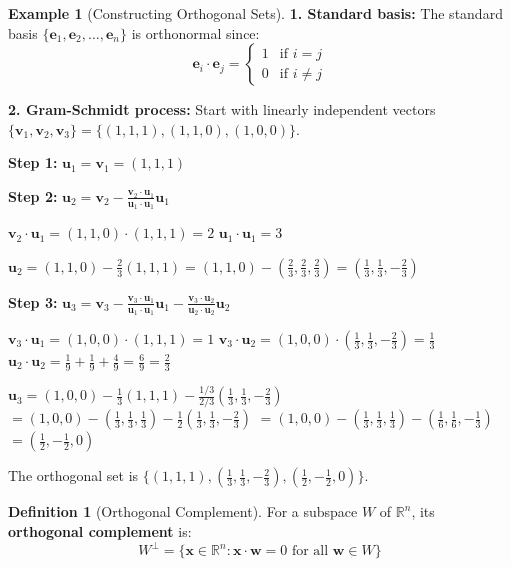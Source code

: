 \documentclass[12pt]{article}
\numberwithin{equation}{section}
\newcommand{\vect}[1]{\boldsymbol{#1}}   %
\theoremstyle{plain}
\theoremstyle{definition}
\newtheorem{definition}[theorem]{Definition}
\newtheorem{example}[theorem]{Example}
\theoremstyle{remark}
\begin{document}
\begin{example}[Constructing Orthogonal Sets]
\textbf{1. Standard basis:}
The standard basis $\{\vect{e}_1, \vect{e}_2, \ldots, \vect{e}_n\}$ is orthonormal since:
$$\vect{e}_i \cdot \vect{e}_j = \begin{cases} 1 & \text{if } i = j \\ 0 & \text{if } i \neq j \end{cases}$$

\textbf{2. Gram-Schmidt process:}
Start with linearly independent vectors $\{\vect{v}_1, \vect{v}_2, \vect{v}_3\} = \{(1,1,1), (1,1,0), (1,0,0)\}$.

\textbf{Step 1:} $\vect{u}_1 = \vect{v}_1 = (1,1,1)$

\textbf{Step 2:} $\vect{u}_2 = \vect{v}_2 - \frac{\vect{v}_2 \cdot \vect{u}_1}{\vect{u}_1 \cdot \vect{u}_1}\vect{u}_1$

$\vect{v}_2 \cdot \vect{u}_1 = (1,1,0) \cdot (1,1,1) = 2$
$\vect{u}_1 \cdot \vect{u}_1 = 3$

$\vect{u}_2 = (1,1,0) - \frac{2}{3}(1,1,1) = (1,1,0) - (\frac{2}{3}, \frac{2}{3}, \frac{2}{3}) = (\frac{1}{3}, \frac{1}{3}, -\frac{2}{3})$

\textbf{Step 3:} $\vect{u}_3 = \vect{v}_3 - \frac{\vect{v}_3 \cdot \vect{u}_1}{\vect{u}_1 \cdot \vect{u}_1}\vect{u}_1 - \frac{\vect{v}_3 \cdot \vect{u}_2}{\vect{u}_2 \cdot \vect{u}_2}\vect{u}_2$

$\vect{v}_3 \cdot \vect{u}_1 = (1,0,0) \cdot (1,1,1) = 1$
$\vect{v}_3 \cdot \vect{u}_2 = (1,0,0) \cdot (\frac{1}{3}, \frac{1}{3}, -\frac{2}{3}) = \frac{1}{3}$
$\vect{u}_2 \cdot \vect{u}_2 = \frac{1}{9} + \frac{1}{9} + \frac{4}{9} = \frac{6}{9} = \frac{2}{3}$

$\vect{u}_3 = (1,0,0) - \frac{1}{3}(1,1,1) - \frac{1/3}{2/3}(\frac{1}{3}, \frac{1}{3}, -\frac{2}{3})$
$= (1,0,0) - (\frac{1}{3}, \frac{1}{3}, \frac{1}{3}) - \frac{1}{2}(\frac{1}{3}, \frac{1}{3}, -\frac{2}{3})$
$= (1,0,0) - (\frac{1}{3}, \frac{1}{3}, \frac{1}{3}) - (\frac{1}{6}, \frac{1}{6}, -\frac{1}{3})$
$= (\frac{1}{2}, -\frac{1}{2}, 0)$

The orthogonal set is $\{(1,1,1), (\frac{1}{3}, \frac{1}{3}, -\frac{2}{3}), (\frac{1}{2}, -\frac{1}{2}, 0)\}$.
\end{example}

\begin{definition}[Orthogonal Complement]
For a subspace $W$ of $\mathbb{R}^n$, its \textbf{orthogonal complement} is:
$$W^{\perp} = \{\vect{x} \in \mathbb{R}^n : \vect{x} \cdot \vect{w} = 0 \text{ for all } \vect{w} \in W\}$$
\end{definition}
\end{document}
